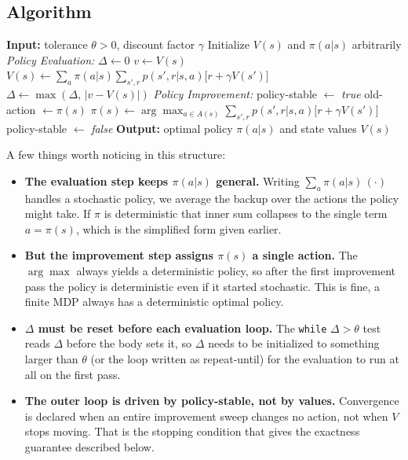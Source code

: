 \documentclass[conference]{IEEEtran}
\begin{document}
\subsection*{Algorithm}
\begin{algorithm}[H]
\caption{Policy Iteration}
\begin{algorithmic}[1]
\State \textbf{Input:} tolerance $\theta > 0$, discount factor $\gamma$
\State Initialize $V(s)$ and $\pi(a|s)$ arbitrarily
    \Statex \hspace{\algorithmicindent}\textit{Policy Evaluation:}
    \While{$\Delta > \theta$}
        \State $\Delta \leftarrow 0$
            \State $v \leftarrow V(s)$
            \State $V(s) \leftarrow \sum_{a} \pi(a|s) \sum_{s',r} p(s',r|s,a)\big[r + \gamma V(s')\big]$
            \State $\Delta \leftarrow \max(\Delta,\, |v - V(s)|)$
        \EndFor
    \EndWhile
    \Statex \hspace{\algorithmicindent}\textit{Policy Improvement:}
    \State policy-stable $\leftarrow$ \textit{true}
        \State old-action $\leftarrow \pi(s)$
        \State $\pi(s) \leftarrow \arg\max_{a \in A(s)} \sum_{s',r} p(s',r|s,a)\big[r + \gamma V(s')\big]$
            \State policy-stable $\leftarrow$ \textit{false}
        \EndIf
    \EndFor
\EndWhile
\State \textbf{Output:} optimal policy $\pi(a|s)$ and state values $V(s)$
\end{algorithmic}
\end{algorithm}

A few things worth noticing in this structure:
\begin{itemize}
    \item \textbf{The evaluation step keeps $\pi(a|s)$ general.} Writing $\sum_a \pi(a|s)\,(\cdot)$ handles a stochastic policy, we average the backup over the actions the policy might take. If $\pi$ is deterministic that inner sum collapses to the single term $a = \pi(s)$, which is the simplified form given earlier.
    \item \textbf{But the improvement step assigns $\pi(s)$ a single action.} The $\arg\max$ always yields a deterministic policy, so after the first improvement pass the policy is deterministic even if it started stochastic. This is fine, a finite MDP always has a deterministic optimal policy.
    \item \textbf{$\Delta$ must be reset before each evaluation loop.} The \texttt{while} $\Delta > \theta$ test reads $\Delta$ before the body sets it, so $\Delta$ needs to be initialized to something larger than $\theta$ (or the loop written as repeat-until) for the evaluation to run at all on the first pass.
    \item \textbf{The outer loop is driven by policy-stable, not by values.} Convergence is declared when an entire improvement sweep changes no action, not when $V$ stops moving. That is the stopping condition that gives the exactness guarantee described below.
\end{itemize}
\end{document}
